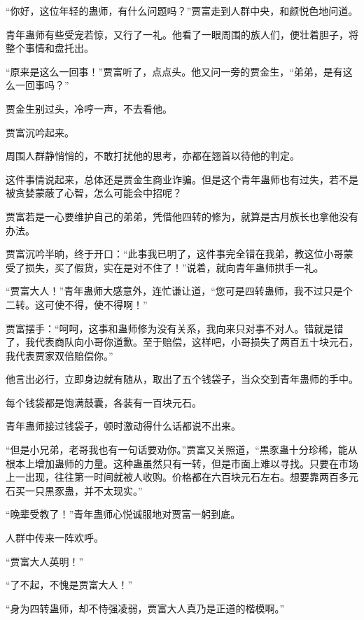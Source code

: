 
\begin{this_body}

“你好，这位年轻的蛊师，有什么问题吗？”贾富走到人群中央，和颜悦色地问道。

青年蛊师有些受宠若惊，又行了一礼。他看了一眼周围的族人们，便壮着胆子，将整个事情和盘托出。

“原来是这么一回事！”贾富听了，点点头。他又问一旁的贾金生，“弟弟，是有这么一回事吗？”

贾金生别过头，冷哼一声，不去看他。

贾富沉吟起来。

周围人群静悄悄的，不敢打扰他的思考，亦都在翘首以待他的判定。

这件事情说起来，总体还是贾金生商业诈骗。但是这个青年蛊师也有过失，若不是被贪婪蒙蔽了心智，怎么可能会中招呢？

贾富若是一心要维护自己的弟弟，凭借他四转的修为，就算是古月族长也拿他没有办法。

贾富沉吟半晌，终于开口：“此事我已明了，这件事完全错在我弟，教这位小哥蒙受了损失，买了假货，实在是对不住了！”说着，就向青年蛊师拱手一礼。

“贾富大人！”青年蛊师大感意外，连忙谦让道，“您可是四转蛊师，我不过只是个二转。这可使不得，使不得啊！”

贾富摆手：“呵呵，这事和蛊师修为没有关系，我向来只对事不对人。错就是错了，我代表商队向小哥你道歉。至于赔偿，这样吧，小哥损失了两百五十块元石，我代表贾家双倍赔偿你。”

他言出必行，立即身边就有随从，取出了五个钱袋子，当众交到青年蛊师的手中。

每个钱袋都是饱满鼓囊，各装有一百块元石。

青年蛊师接过钱袋子，顿时激动得什么话都说不出来。

“但是小兄弟，老哥我也有一句话要劝你。”贾富又关照道，“黒豕蛊十分珍稀，能从根本上增加蛊师的力量。这种蛊虽然只有一转，但是市面上难以寻找。只要在市场上一出现，往往第一时间就被人收购。价格都在六百块元石左右。想要靠两百多元石买一只黒豕蛊，并不太现实。”

“晚辈受教了！”青年蛊师心悦诚服地对贾富一躬到底。

人群中传来一阵欢呼。

“贾富大人英明！”

“了不起，不愧是贾富大人！”

“身为四转蛊师，却不恃强凌弱，贾富大人真乃是正道的楷模啊。”


\end{this_body}

